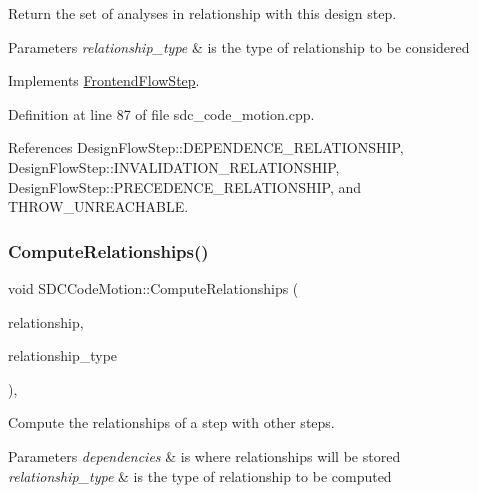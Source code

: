 Return the set of analyses in relationship with this design step. 


\begin{DoxyParams}{Parameters}
{\em relationship\+\_\+type} & is the type of relationship to be considered \\
\hline
\end{DoxyParams}


Implements \hyperlink{classFrontendFlowStep_abeaff70b59734e462d347ed343dd700d}{Frontend\+Flow\+Step}.



Definition at line 87 of file sdc\+\_\+code\+\_\+motion.\+cpp.



References Design\+Flow\+Step\+::\+D\+E\+P\+E\+N\+D\+E\+N\+C\+E\+\_\+\+R\+E\+L\+A\+T\+I\+O\+N\+S\+H\+IP, Design\+Flow\+Step\+::\+I\+N\+V\+A\+L\+I\+D\+A\+T\+I\+O\+N\+\_\+\+R\+E\+L\+A\+T\+I\+O\+N\+S\+H\+IP, Design\+Flow\+Step\+::\+P\+R\+E\+C\+E\+D\+E\+N\+C\+E\+\_\+\+R\+E\+L\+A\+T\+I\+O\+N\+S\+H\+IP, and T\+H\+R\+O\+W\+\_\+\+U\+N\+R\+E\+A\+C\+H\+A\+B\+LE.

\mbox{\label{classSDCCodeMotion_aba1edb7d7851104686225cf6aaa92c56}} 
\subsubsection{\texorpdfstring{Compute\+Relationships()}{ComputeRelationships()}}
{\footnotesize\ttfamily void S\+D\+C\+Code\+Motion\+::\+Compute\+Relationships (\begin{DoxyParamCaption}\item[{\hyperlink{classDesignFlowStepSet}{Design\+Flow\+Step\+Set} \&}]{relationship,  }\item[{const \hyperlink{classDesignFlowStep_a723a3baf19ff2ceb77bc13e099d0b1b7}{Design\+Flow\+Step\+::\+Relationship\+Type}}]{relationship\+\_\+type }\end{DoxyParamCaption})\hspace{0.3cm}{\ttfamily [override]}, {\ttfamily [virtual]}}



Compute the relationships of a step with other steps. 


\begin{DoxyParams}{Parameters}
{\em dependencies} & is where relationships will be stored \\
\hline
{\em relationship\+\_\+type} & is the type of relationship to be computed \\
\hline
\end{DoxyParams}


